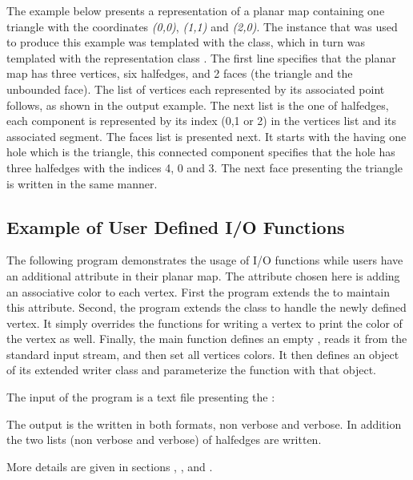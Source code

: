 \begin{ccAdvanced}
The example below presents a representation of a planar map containing
one triangle with the coordinates {\em (0,0)}, {\em (1,1)} and {\em
(2,0)}.  The  instance that was used to produce this
example was templated with the 
class, which in turn was templated with the representation class
.  The first line specifies that the
planar map has three vertices, six halfedges, and 2 faces (the
triangle and the unbounded face).  The list of vertices each
represented by its associated point follows, as shown in the output
example.  The next list is the one of halfedges, each component is
represented by its index (0,1 or 2) in the vertices list and its
associated segment.  The faces list is presented next. It starts with
the  having one hole which is the triangle,
this connected component specifies that the hole has three halfedges
with the indices 4, 0 and 3. The next face presenting the triangle is
written in the same manner.


\subsection*{Example of User Defined I/O Functions}
\label{PM_sec:example10}

The following program demonstrates the usage of I/O functions while
users have an additional attribute in their planar map.
The attribute chosen here is adding an associative color to each
vertex. First the program extends the  to maintain this
attribute. Second, the program extends the  class
to handle the newly defined vertex. 
It simply overrides the functions for writing a vertex to print the
color of the vertex as well. Finally, the main function defines an
empty , reads it from the standard input stream, and
then set all vertices colors. It then defines an object of its
extended writer class and parameterize the function 
with that object.


The input of the program is a text file presenting the :

The output is the  written in both formats, non
verbose and verbose. In addition the two lists (non verbose and
verbose) of halfedges are written.

More details are given in sections
,
, 
 and
.

\end{ccAdvanced}

